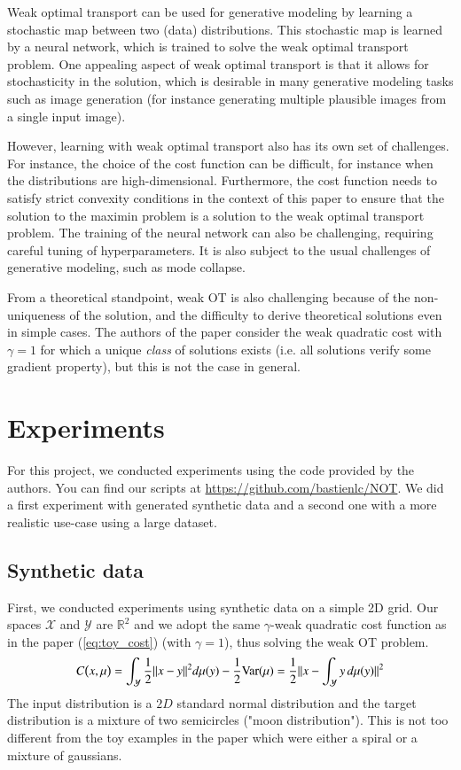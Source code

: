 \documentclass[11pt]{article}
\newcommand{\R}{\mathbb{R}}
\begin{document}
Weak optimal transport can be used for generative modeling by learning a stochastic map between two (data) distributions. This stochastic map is learned by a neural network, which is trained to solve the weak optimal transport problem. One appealing aspect of weak optimal transport is that it allows for stochasticity in the solution, which is desirable in many generative modeling tasks such as image generation (for instance generating multiple plausible images from a single input image).

However, learning with weak optimal transport also has its own set of challenges. For instance, the choice of the cost function can be difficult, for instance when the distributions are high-dimensional. Furthermore, the cost function needs to satisfy strict convexity conditions in the context of this paper to ensure that the solution to the maximin problem is a solution to the weak optimal transport problem. The training of the neural network can also be challenging, requiring careful tuning of hyperparameters. It is also subject to the usual challenges of generative modeling, such as mode collapse.

From a theoretical standpoint, weak OT is also challenging because of the non-uniqueness of the solution, and the difficulty to derive theoretical solutions even in simple cases. The authors of the paper consider the weak quadratic cost with $\gamma=1$ for which a unique \textit{class} of solutions exists (i.e. all solutions verify some gradient property), but this is not the case in general.

\section{Experiments}

For this project, we conducted experiments using the code provided by the authors. You can find our scripts at \href{https://github.com/bastienlc/NOT}{https://github.com/bastienlc/NOT}. We did a first experiment with generated synthetic data and a second one with a more realistic use-case using a large dataset.

\subsection{Synthetic data}

First, we conducted experiments using synthetic data on a simple 2D grid. Our spaces $\mathcal{X}$ and $\mathcal{Y}$ are $\R^2$ and we adopt the same $\gamma$-weak quadratic cost function as in the paper (\ref{eq:toy_cost}) (with $\gamma=1$), thus solving the weak OT problem.
\begin{equation}
    C\big{(}x,\mu\big{)}=\int_{\mathcal{Y}}\frac{1}{2}\|x-y\|^{2}d\mu(y)-\frac{1}{2} \text{Var}(\mu)=\frac{1}{2}\|x-\int_{\mathcal{Y}}y\,d\mu(y)\|^{2}
    \label{eq:toy_cost}
\end{equation}
The input distribution is a $2D$ standard normal distribution and the target distribution is a mixture of two semicircles ("moon distribution"). This is not too different from the toy examples in the paper which were either a spiral or a mixture of gaussians.
\end{document}
